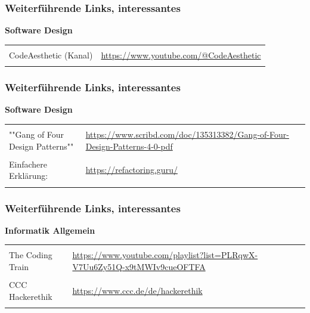 \begin{frame}
    \frametitle{Weiterführende Links, interessantes}

    \textbf{\large Software Design}

    \begin{table}[H]
        \begin{tabularx}{\linewidth}{|lX|}
            &\\
            CodeAesthetic (Kanal)&\url{https://www.youtube.com/@CodeAesthetic}\\
            &\\
        \end{tabularx}
    \end{table}
\end{frame}
\begin{frame}
    \frametitle{Weiterführende Links, interessantes}

    \textbf{\large Software Design}

    \begin{table}[H]
        \begin{tabularx}{\linewidth}{|lX|}
            &\\
            ""Gang of Four Design Patterns"" &\url{https://www.scribd.com/doc/135313382/Gang-of-Four-Design-Patterns-4-0-pdf}\\
            &\\
            Einfachere Erklärung: &\url{https://refactoring.guru/}\\
            &\\
        \end{tabularx}
    \end{table}
\end{frame}
\begin{frame}
    \frametitle{Weiterführende Links, interessantes}

    \textbf{\large Informatik Allgemein}

    \begin{table}[H]
        \begin{tabularx}{\linewidth}{|lX|}
            &\\
            The Coding Train &\url{https://www.youtube.com/playlist?list=PLRqwX-V7Uu6Zy51Q-x9tMWIv9cueOFTFA}\\
            &\\
            CCC Hackerethik&\url{https://www.ccc.de/de/hackerethik}\\
            &\\
        \end{tabularx}
    \end{table}
\end{frame}


